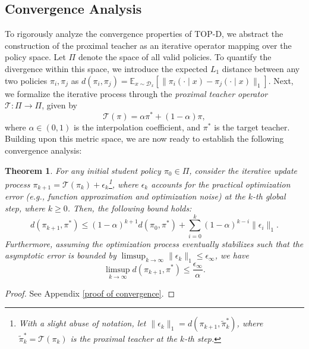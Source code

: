\documentclass{article}
\theoremstyle{plain}
\newtheorem{theorem}{Theorem}[section]
\theoremstyle{definition}
\theoremstyle{remark}
\begin{document}
\subsection{Convergence Analysis}\label{Convergence Analysis}
To rigorously analyze the convergence properties of TOP-D, we abstract the construction of the proximal teacher as an iterative operator mapping over the policy space. Let $\Pi$ denote the space of all valid policies. To quantify the divergence within this space, we introduce the expected $L_1$ distance between any two policies $\pi_i, \pi_j$ as $d(\pi_i, \pi_j) = \mathbb{E}_{x \sim \mathcal{D}_x} \left[ \lVert \pi_i(\cdot \mid x) - \pi_j(\cdot \mid x) \rVert_1 \right]$. Next, we formalize the iterative process through the \textit{proximal teacher operator} $\mathcal{T}:\Pi\to\Pi$, given by
\begin{equation}\label{proximal teacher operator}
	\mathcal{T}(\pi)=\alpha\pi^*+(1-\alpha)\pi,
\end{equation}
where $\alpha\in(0,1)$ is the interpolation coefficient, and $\pi^*$ is the target teacher. Building upon this metric space, we are now ready to establish the following convergence analysis:
\begin{theorem}\label{convergence}
	For any initial student policy $\pi_0\in\Pi$, consider the iterative update process $\pi_{k+1}=\mathcal{T}(\pi_k)+\epsilon_k$\footnote{With a slight abuse of notation, let $\lVert\epsilon_k\rVert_1=d(\pi_{k+1},\tilde{\pi}_k^*)$, where $\tilde{\pi}_k^*=\mathcal{T}(\pi_k)$ is the proximal teacher at the $k$-th step.}, where $\epsilon_k$ accounts for the practical optimization error (e.g., function approximation and optimization noise) at the $k$-th global step, where $k\geq0$. Then, the following bound holds:
	\begin{equation}
		d(\pi_{k+1},\pi^*)\leq(1-\alpha)^{k+1}d(\pi_0,\pi^*)+\sum_{i=0}^{k}(1-\alpha)^{k-i}\lVert\epsilon_i\rVert_1.
	\end{equation}
	Furthermore, assuming the optimization process eventually stabilizes such that the asymptotic error is bounded by $\limsup_{k\rightarrow \infty}\lVert\epsilon_{k}\rVert_1\leq \epsilon_{\infty}$, we have
	\begin{equation}
		\limsup_{k \rightarrow \infty} d(\pi_{k+1}, \pi^*) \leq \frac{\epsilon_{\infty}}{\alpha}.
	\end{equation}
\end{theorem}
\begin{proof}
	See Appendix \ref{proof of convergence}.
\end{proof}
\end{document}
